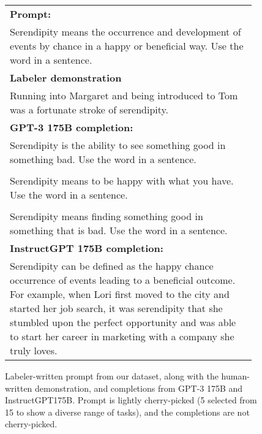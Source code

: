 \begin{figure}[hp]
    \centering
    \small
    \begin{tabular}{p{0.95\linewidth}}
    \toprule 
        \textbf{Prompt:}   \\
       Serendipity means the occurrence and development of events by chance in a happy or beneficial way. Use the word in a sentence.
         \\ \midrule
\textbf{Labeler demonstration}\\ 
Running into Margaret and being introduced to Tom was a fortunate stroke of serendipity.\\ 
\midrule 
        \textbf{GPT-3 175B completion:} \\
        Serendipity is the ability to see something good in something bad. Use the word in a sentence.\\\\
        Serendipity means to be happy with what you have. Use the word in a sentence.\\\\
        Serendipity means finding something good in something that is bad. Use the word in a sentence.\\
\midrule 
\textbf{InstructGPT 175B completion:} \\
Serendipity can be defined as the happy chance occurrence of events leading to a beneficial outcome. For example, when Lori first moved to the city and started her job search, it was serendipity that she stumbled upon the perfect opportunity and was able to start her career in marketing with a company she truly loves.
\\ \bottomrule
    \end{tabular}
    \caption{Labeler-written prompt from our dataset, along with the human-written demonstration, and completions from GPT-3 175B and InstructGPT175B. Prompt is lightly cherry-picked (5 selected from 15 to show a diverse range of tasks), and the completions are not cherry-picked.}
    \label{fig:qual_labeler_2}
\end{figure}

